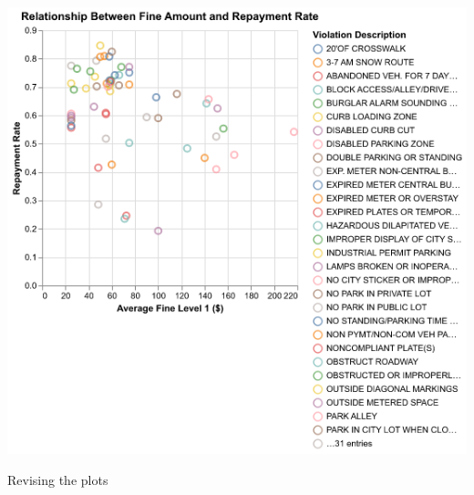 \documentclass[
  letterpaper,
  DIV=11,
  numbers=noendperiod]{scrartcl}
\begin{document}
\includegraphics{ps2_final_files/figure-pdf/cell-25-output-1.png}

Revising the plots
\end{document}
